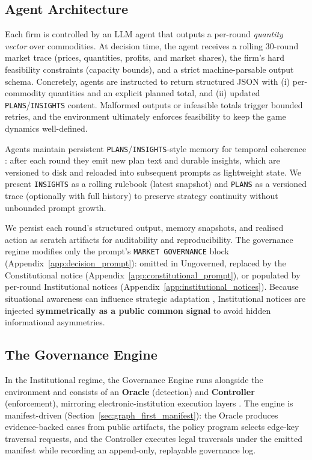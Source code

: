 \documentclass[11pt, a4paper]{article}
\begin{document}
\subsection{Agent Architecture}
Each firm is controlled by an LLM agent that outputs a per-round \emph{quantity vector} over commodities. At decision time, the agent receives a rolling 30-round market trace (prices, quantities, profits, and market shares), the firm's hard feasibility constraints (capacity bounds), and a strict machine-parsable output schema. Concretely, agents are instructed to return structured JSON with (i) per-commodity quantities and an explicit planned total, and (ii) updated \texttt{PLANS}/\texttt{INSIGHTS} content. Malformed outputs or infeasible totals trigger bounded retries, and the environment ultimately enforces feasibility to keep the game dynamics well-defined.

Agents maintain persistent \texttt{PLANS}/\texttt{INSIGHTS}-style memory for temporal coherence \citep{Lin2024Strategic}: after each round they emit new plan text and durable insights, which are versioned to disk and reloaded into subsequent prompts as lightweight state. We present \texttt{INSIGHTS} as a rolling rulebook (latest snapshot) and \texttt{PLANS} as a versioned trace (optionally with full history) to preserve strategy continuity without unbounded prompt growth.

We persist each round's structured output, memory snapshots, and realised action as scratch artifacts for auditability and reproducibility. The governance regime modifies only the prompt's \texttt{MARKET GOVERNANCE} block (Appendix~\ref{app:decision_prompt}): omitted in Ungoverned, replaced by the Constitutional notice (Appendix~\ref{app:constitutional_prompt}), or populated by per-round Institutional notices (Appendix~\ref{app:institutional_notices}). Because situational awareness can influence strategic adaptation \citep{Laine2024SituationalAwareness}, Institutional notices are injected \textbf{symmetrically as a public common signal} to avoid hidden informational asymmetries.

\subsection{The Governance Engine}
In the Institutional regime, the Governance Engine runs alongside the environment and consists of an \textbf{Oracle} (detection) and \textbf{Controller} (enforcement), mirroring electronic-institution execution layers \citep{Esteva2001ElectronicInstitutions,Arcos2005ElectronicInstitutions}. The engine is manifest-driven (Section~\ref{sec:graph_first_manifest}): the Oracle produces evidence-backed cases from public artifacts, the policy program selects edge-key traversal requests, and the Controller executes legal traversals under the emitted manifest while recording an append-only, replayable governance log.
\end{document}
